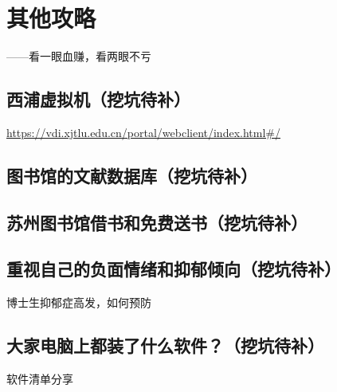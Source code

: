 
\chapter{其他攻略}

\begin{flushright}
    ——看一眼血赚，看两眼不亏
\end{flushright}







\section{西浦虚拟机（挖坑待补）}
\url{https://vdi.xjtlu.edu.cn/portal/webclient/index.html#/}
\section{图书馆的文献数据库（挖坑待补）}
\section{苏州图书馆借书和免费送书（挖坑待补）}
\section{重视自己的负面情绪和抑郁倾向（挖坑待补）}
博士生抑郁症高发，如何预防
\section{大家电脑上都装了什么软件？（挖坑待补）}
软件清单分享
